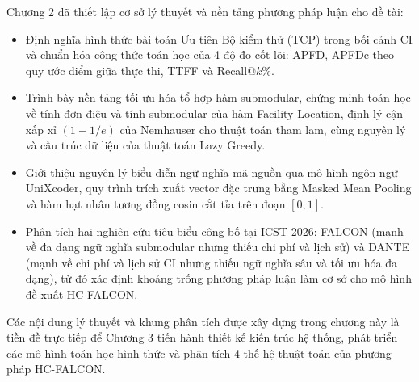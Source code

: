 Chương 2 đã thiết lập cơ sở lý thuyết và nền tảng phương pháp luận cho đề tài:
\begin{itemize}
    \item Định nghĩa hình thức bài toán Ưu tiên Bộ kiểm thử (TCP) trong bối cảnh CI và chuẩn hóa công thức toán học của 4 độ đo cốt lõi: APFD, APFDc theo quy ước điểm giữa thực thi, TTFF và Recall@$k\%$.
    \item Trình bày nền tảng tối ưu hóa tổ hợp hàm submodular, chứng minh toán học về tính đơn điệu và tính submodular của hàm Facility Location, định lý cận xấp xỉ $(1 - 1/e)$ của Nemhauser cho thuật toán tham lam, cùng nguyên lý và cấu trúc dữ liệu của thuật toán Lazy Greedy.
    \item Giới thiệu nguyên lý biểu diễn ngữ nghĩa mã nguồn qua mô hình ngôn ngữ UniXcoder, quy trình trích xuất vector đặc trưng bằng Masked Mean Pooling và hàm hạt nhân tương đồng cosin cắt tỉa trên đoạn $[0, 1]$.
    \item Phân tích hai nghiên cứu tiêu biểu công bố tại ICST 2026: FALCON (mạnh về đa dạng ngữ nghĩa submodular nhưng thiếu chi phí và lịch sử) và DANTE (mạnh về chi phí và lịch sử CI nhưng thiếu ngữ nghĩa sâu và tối ưu hóa đa dạng), từ đó xác định khoảng trống phương pháp luận làm cơ sở cho mô hình đề xuất HC-FALCON.
\end{itemize}

Các nội dung lý thuyết và khung phân tích được xây dựng trong chương này là tiền đề trực tiếp để Chương 3 tiến hành thiết kế kiến trúc hệ thống, phát triển các mô hình toán học hình thức và phân tích 4 thế hệ thuật toán của phương pháp HC-FALCON.
